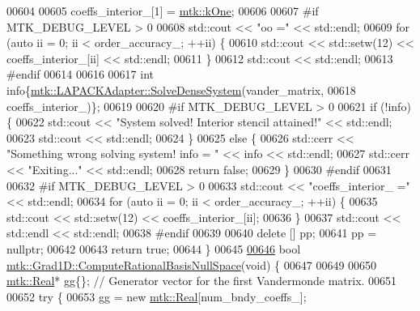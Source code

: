 \begin{DoxyCode}
{{00604 
00605   coeffs\_interior\_[1] = \hyperlink{group__c01-roots_ga26407c24d43b6b95480943340d285c71}{mtk::kOne};
00606 
00607 \textcolor{preprocessor}{  #if MTK\_DEBUG\_LEVEL > 0}
00608   std::cout << \textcolor{stringliteral}{"oo ="} << std::endl;
00609   \textcolor{keywordflow}{for} (\textcolor{keyword}{auto} ii = 0; ii < order\_accuracy\_; ++ii) \{
00610     std::cout << std::setw(12) << coeffs\_interior\_[ii] << std::endl;
00611   \}
00612   std::cout << std::endl;
00613 \textcolor{preprocessor}{  #endif}
00614 
00616 
00617   \textcolor{keywordtype}{int} info\{\hyperlink{classmtk_1_1LAPACKAdapter_a7428bccf74fd4a4af68fb7233846da22}{mtk::LAPACKAdapter::SolveDenseSystem}(vander\_matrix,
00618                                                 coeffs\_interior\_)\};
00619 
00620 \textcolor{preprocessor}{  #if MTK\_DEBUG\_LEVEL > 0}
00621   \textcolor{keywordflow}{if} (!info) \{
00622     std::cout << \textcolor{stringliteral}{"System solved! Interior stencil attained!"} << std::endl;
00623     std::cout << std::endl;
00624   \}
00625   \textcolor{keywordflow}{else} \{
00626     std::cerr << \textcolor{stringliteral}{"Something wrong solving system! info = "} << info << std::endl;
00627     std::cerr << \textcolor{stringliteral}{"Exiting..."} << std::endl;
00628     \textcolor{keywordflow}{return} \textcolor{keyword}{false};
00629   \}
00630 \textcolor{preprocessor}{  #endif}
00631 
00632 \textcolor{preprocessor}{  #if MTK\_DEBUG\_LEVEL > 0}
00633   std::cout << \textcolor{stringliteral}{"coeffs\_interior\_ ="} << std::endl;
00634   \textcolor{keywordflow}{for} (\textcolor{keyword}{auto} ii = 0; ii < order\_accuracy\_; ++ii) \{
00635     std::cout << std::setw(12) << coeffs\_interior\_[ii];
00636   \}
00637   std::cout << std::endl << std::endl;
00638 \textcolor{preprocessor}{  #endif}
00639 
00640   \textcolor{keyword}{delete} [] pp;
00641   pp = \textcolor{keyword}{nullptr};
00642 
00643   \textcolor{keywordflow}{return} \textcolor{keyword}{true};
00644 \}
00645 
\hypertarget{mtk__grad__1d_8cc_source_l00646}{}\hyperlink{classmtk_1_1Grad1D_a2d03e6a3961bee558f575ec4099782a9}{00646} \textcolor{keywordtype}{bool} \hyperlink{classmtk_1_1Grad1D_a2d03e6a3961bee558f575ec4099782a9}{mtk::Grad1D::ComputeRationalBasisNullSpace}(\textcolor{keywordtype}{void}) \{
00647 
00649 
00650   \hyperlink{group__c01-roots_gac080bbbf5cbb5502c9f00405f894857d}{mtk::Real}* gg\{\}; \textcolor{comment}{// Generator vector for the first Vandermonde matrix.}
00651 
00652   \textcolor{keywordflow}{try} \{
00653     gg = \textcolor{keyword}{new} \hyperlink{group__c01-roots_gac080bbbf5cbb5502c9f00405f894857d}{mtk::Real}[num\_bndy\_coeffs\_];
}}
\end{DoxyCode}

